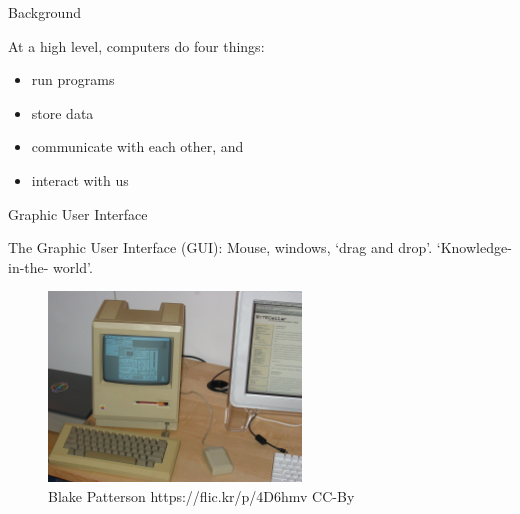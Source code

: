 \documentclass[aspectratio=1610, 11pt]{beamer} %
\begin{document}
\begin{frame}{Background}

At a high level, computers do four things:
\begin{itemize}[label=\textbullet]
    \item run programs
    \item store data
    \item communicate with each other, and
    \item interact with us
\end{itemize}


\end{frame}

\begin{frame}{Graphic User Interface}
    
   The Graphic User Interface (GUI): Mouse, windows, `drag and drop'. `Knowledge-in-the- world'. \cite{Norman2013-xk}
    \begin{figure}[H]
        
        \includegraphics[width=0.6\textwidth]{figures/2388811229_7e3a50354d_b_d.jpg}
        \caption{Blake Patterson https://flic.kr/p/4D6hmv CC-By}
        \label{fig:gui}
    \end{figure}
   
\end{frame}
\end{document}
